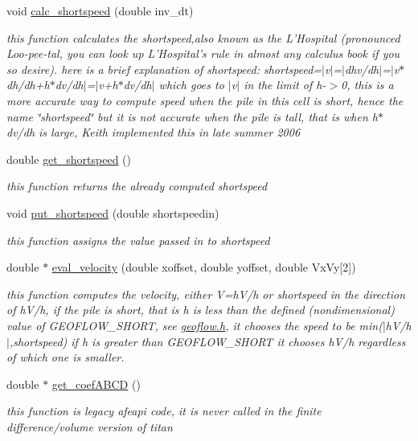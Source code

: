 \begin{CompactItemize}
void \hyperlink{classElement_a81}{calc\_\-shortspeed} (double inv\_\-dt)
\begin{CompactList}\small\item\em this function calculates the shortspeed,also known as the L'Hospital (pronounced Loo-pee-tal, you can look up L'Hospital's rule in almost any calculus book if you so desire). here is a brief explanation of shortspeed: shortspeed=$|$v$|$=$|$dhv/dh$|$=$|$v$\ast$dh/dh+h$\ast$dv/dh$|$=$|$v+h$\ast$dv/dh$|$ which goes to $|$v$|$ in the limit of h-$>$0, this is a more accurate way to compute speed when the pile in this cell is short, hence the name \char`\"{}shortspeed\char`\"{} but it is not accurate when the pile is tall, that is when h$\ast$dv/dh is large, Keith implemented this in late summer 2006 \item\end{CompactList}\item 
double \hyperlink{classElement_a82}{get\_\-shortspeed} ()
\begin{CompactList}\small\item\em this function returns the already computed shortspeed \item\end{CompactList}\item 
void \hyperlink{classElement_a83}{put\_\-shortspeed} (double shortspeedin)
\begin{CompactList}\small\item\em this function assigns the value passed in to shortspeed \item\end{CompactList}\item 
double $\ast$ \hyperlink{classElement_a84}{eval\_\-velocity} (double xoffset, double yoffset, double Vx\-Vy\mbox{[}2\mbox{]})
\begin{CompactList}\small\item\em this function computes the velocity, either V=h\-V/h or shortspeed in the direction of h\-V/h, if the pile is short, that is h is less than the defined (nondimensional) value of GEOFLOW\_\-SHORT, see \hyperlink{geoflow_8h}{geoflow.h}, it chooses the speed to be min($|$h\-V/h$|$,shortspeed) if h is greater than GEOFLOW\_\-SHORT it chooses h\-V/h regardless of which one is smaller. \item\end{CompactList}\item 
double $\ast$ \hyperlink{classElement_a85}{get\_\-coef\-ABCD} ()
\begin{CompactList}\small\item\em this function is legacy afeapi code, it is never called in the finite difference/volume version of titan \item\end{CompactList}\item 

\end{CompactItemize}
